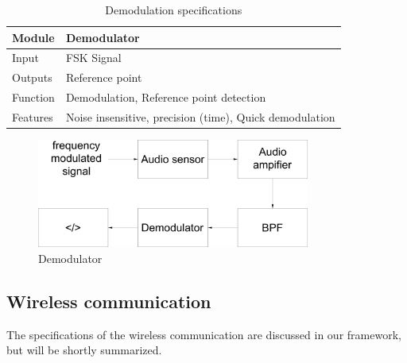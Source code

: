 \documentclass[10pt,a4paper]{article}
\begin{document}
\begin{table}[H]
\centering
\caption{Demodulation specifications}
\label{demosensor}
\begin{tabular}{|p{}|p{}|}
\hline
Module   & Demodulator                                   \\ \hline
Input    & FSK Signal                                             \\ \hline
Outputs  & Reference point                                         \\ \hline
Function & Demodulation, Reference point detection \\ \hline
Features & Noise insensitive, precision (time), Quick demodulation  \\ \hline
\end{tabular}
\end{table}

\begin{figure}[H]
  \centering
      \includegraphics[width=0.8\textwidth]{demodulator.pdf}
  \caption{Demodulator}
  \label{demodulator}
\end{figure}

\subsection{Wireless communication} 

The specifications of the wireless communication are  discussed in our framework, but will be shortly summarized. 
\end{document}
